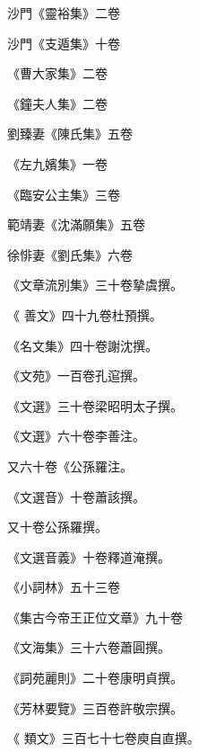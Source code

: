 \begin{pinyinscope}
 沙門《靈裕集》二卷



 沙門《支遁集》十卷



 《曹大家集》二卷



 《鐘夫人集》二卷



 劉臻妻《陳氏集》五卷



 《左九嬪集》一卷



 《臨安公主集》三卷



 範靖妻《沈滿願集》五卷



 徐悱妻《劉氏集》六卷



 《文章流別集》三十卷摯虞撰。



 《
 善文》四十九卷杜預撰。



 《名文集》四十卷謝沈撰。



 《文苑》一百卷孔逭撰。



 《文選》三十卷梁昭明太子撰。



 《文選》六十卷李善注。



 又六十卷《公孫羅注。



 《文選音》十卷蕭該撰。



 又十卷公孫羅撰。



 《文選音義》十卷釋道淹撰。



 《小詞林》五十三卷



 《集古今帝王正位文章》九十卷



 《文海集》三十六卷蕭圓撰。



 《詞苑麗則》二十卷康明貞撰。



 《芳林要覽》三百卷許敬宗撰。



 《
 類文》三百七十七卷庾自直撰。




\end{pinyinscope}
